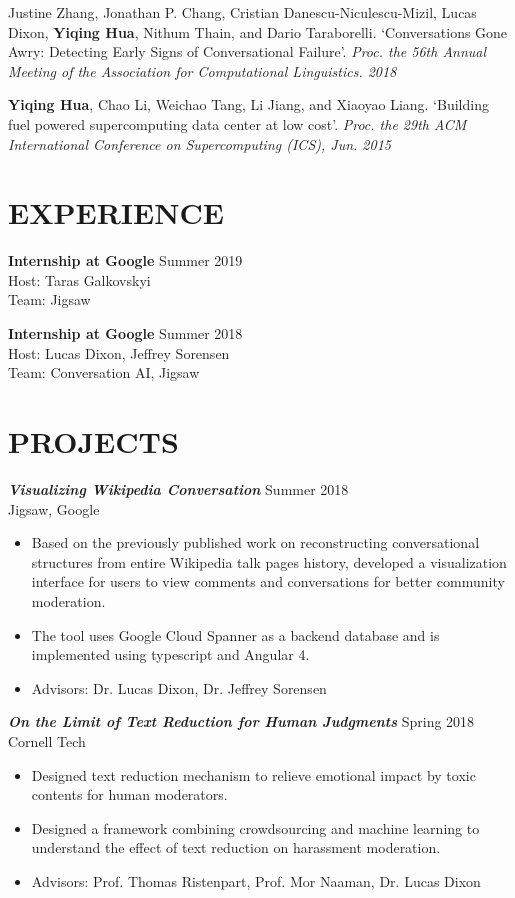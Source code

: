 \documentclass[margin, 10pt]{res} %
\begin{document}
\begin{resume}
Justine Zhang, Jonathan P. Chang, Cristian Danescu-Niculescu-Mizil, Lucas Dixon, \textbf{Yiqing Hua}, Nithum Thain, and Dario Taraborelli.
`Conversations Gone Awry: Detecting Early Signs of Conversational Failure'.
\textit{Proc. the 56th Annual Meeting of the Association for Computational Linguistics. 2018}

\textbf{Yiqing Hua}, Chao Li, Weichao Tang, Li Jiang, and Xiaoyao Liang.
`Building fuel powered supercomputing data center at low cost'.
\textit{Proc. the 29th ACM International Conference on Supercomputing (ICS), Jun. 2015}


\section{EXPERIENCE}
\textbf{Internship at Google} \hfill Summer 2019\\
Host: Taras Galkovskyi\\
Team: Jigsaw

\textbf{Internship at Google} \hfill Summer 2018\\
Host: Lucas Dixon, Jeffrey Sorensen\\
Team: Conversation AI, Jigsaw

\section{PROJECTS}

{\sl \textbf{Visualizing Wikipedia Conversation}} \hfill Summer 2018\\
Jigsaw, Google
\begin{itemize}
\item Based on the previously published work on reconstructing conversational structures from
      entire Wikipedia talk pages history, developed a visualization interface for users to view
      comments and conversations for better community moderation.
\item The tool uses Google Cloud Spanner as a backend database and is implemented using typescript and Angular 4.
\item Advisors: Dr. Lucas Dixon, Dr. Jeffrey Sorensen
\end{itemize}

{\sl \textbf{On the Limit of Text Reduction for Human Judgments}} \hfill Spring 2018\\
Cornell Tech
\begin{itemize}
\item Designed text reduction mechanism to relieve emotional impact by toxic contents for human moderators.
\item Designed a framework combining crowdsourcing and machine learning to understand the effect of text reduction on harassment moderation.
\item Advisors: Prof. Thomas Ristenpart, Prof. Mor Naaman, Dr. Lucas Dixon
\end{itemize}


\end{resume}
\end{document}
